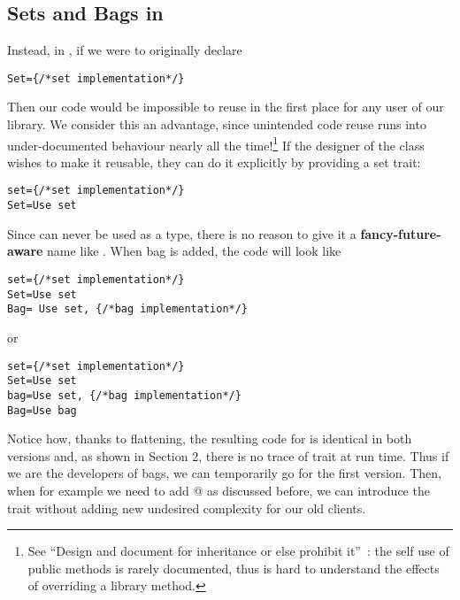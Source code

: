 \subsection{Sets and Bags in \name}
Instead, in \name, if we were to originally declare
\saveSpace\saveSpace\begin{lstlisting}
Set={/*set implementation*/} 
\end{lstlisting}\saveSpace\saveSpace
Then our code would be impossible to reuse in the first place for any user of our library.
We consider this an advantage, since unintended code reuse runs into under-documented behaviour nearly all the time!\footnote{See
``Design and document for inheritance or else prohibit
it''~\cite{Bloch08}: the
self use of public methods is rarely documented, thus is hard to understand the effects of overriding a library method.
}
If the designer of the \Q@Set@ class wishes to make it reusable, they can do it explicitly by providing a set trait{:}%
\saveSpace\saveSpace\begin{lstlisting}
set={/*set implementation*/} 
Set=Use set
\end{lstlisting}\saveSpace\saveSpace
Since \Q@set@ can never be used as a type, there is no reason to give it a {\bf fancy-future-aware} name like
\Q@AbstractSetOrBag@.
When bag is added, the code will look like%
\saveSpace\saveSpace\begin{lstlisting}
set={/*set implementation*/} 
Set=Use set
Bag= Use set, {/*bag implementation*/}
\end{lstlisting}\saveSpace\saveSpace
or %
\saveSpace\saveSpace\begin{lstlisting}
set={/*set implementation*/} 
Set=Use set
bag=Use set, {/*bag implementation*/}
Bag=Use bag
\end{lstlisting}\saveSpace\saveSpace
Notice how, thanks to flattening, the resulting code for \Q@Bag@ is identical in both versions
and, as shown in Section 2, there is no trace of trait \Q@bag@ at run time. 
Thus if we are the developers of bags, we can temporarily go for the first version.
Then, when for example we need to add @ as discussed before,
we can introduce the \Q@bag@ trait without adding new undesired complexity for our old clients.

